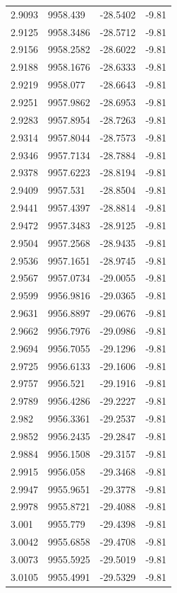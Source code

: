 \begin{table}[H]
\begin{tabular}{llll}
2.9093 & 9958.439 & -28.5402 & -9.81 \\
2.9125 & 9958.3486 & -28.5712 & -9.81 \\
2.9156 & 9958.2582 & -28.6022 & -9.81 \\
2.9188 & 9958.1676 & -28.6333 & -9.81 \\
2.9219 & 9958.077 & -28.6643 & -9.81 \\
2.9251 & 9957.9862 & -28.6953 & -9.81 \\
2.9283 & 9957.8954 & -28.7263 & -9.81 \\
2.9314 & 9957.8044 & -28.7573 & -9.81 \\
2.9346 & 9957.7134 & -28.7884 & -9.81 \\
2.9378 & 9957.6223 & -28.8194 & -9.81 \\
2.9409 & 9957.531 & -28.8504 & -9.81 \\
2.9441 & 9957.4397 & -28.8814 & -9.81 \\
2.9472 & 9957.3483 & -28.9125 & -9.81 \\
2.9504 & 9957.2568 & -28.9435 & -9.81 \\
2.9536 & 9957.1651 & -28.9745 & -9.81 \\
2.9567 & 9957.0734 & -29.0055 & -9.81 \\
2.9599 & 9956.9816 & -29.0365 & -9.81 \\
2.9631 & 9956.8897 & -29.0676 & -9.81 \\
2.9662 & 9956.7976 & -29.0986 & -9.81 \\
2.9694 & 9956.7055 & -29.1296 & -9.81 \\
2.9725 & 9956.6133 & -29.1606 & -9.81 \\
2.9757 & 9956.521 & -29.1916 & -9.81 \\
2.9789 & 9956.4286 & -29.2227 & -9.81 \\
2.982 & 9956.3361 & -29.2537 & -9.81 \\
2.9852 & 9956.2435 & -29.2847 & -9.81 \\
2.9884 & 9956.1508 & -29.3157 & -9.81 \\
2.9915 & 9956.058 & -29.3468 & -9.81 \\
2.9947 & 9955.9651 & -29.3778 & -9.81 \\
2.9978 & 9955.8721 & -29.4088 & -9.81 \\
3.001 & 9955.779 & -29.4398 & -9.81 \\
3.0042 & 9955.6858 & -29.4708 & -9.81 \\
3.0073 & 9955.5925 & -29.5019 & -9.81 \\
3.0105 & 9955.4991 & -29.5329 & -9.81 \\

\end{tabular}
\end{table}
